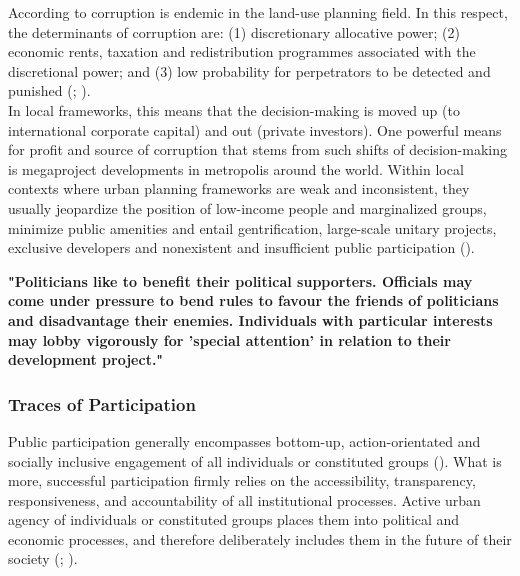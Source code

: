\documentclass[11pt]{report}
\begin{document}
According to
\href{Chiodelli}{\cite{chiodelli_corruption_2015}} corruption is endemic in the land-use planning field.
In this respect, the determinants of corruption are:
(1) discretionary allocative power; (2) economic rents, taxation and redistribution programmes associated with the discretional power; and (3) low probability for perpetrators to be detected and punished
(\href{Healey}{\citealt{healey_collaborative_1997}}; 
\href{Chiodelli}{\citealt{chiodelli_corruption_2015}}).
\\

In local frameworks, this means that the decision-making is moved up (to international corporate capital) and out (private investors).
One powerful means for profit and source of corruption that stems from such shifts of decision-making is megaproject developments in metropolis around the world.
Within local contexts where urban planning frameworks are weak and inconsistent, they usually jeopardize the position of low-income people and marginalized groups, minimize public amenities and entail gentrification, large-scale unitary projects, exclusive developers and nonexistent and insufficient public participation (\href{Farnstein}{\citealt{Farnstein_Just_2010}}). %

\textbf{"Politicians like to benefit their political supporters. Officials may come under pressure to bend rules to favour the friends of politicians and disadvantage their enemies. Individuals with particular interests may lobby vigorously for 'special attention' in relation to their development project." \href{Healey}{\citealt{healey_collaborative_1997}}}

\subsubsection{Traces of Participation}

Public participation generally encompasses bottom-up, action-orientated and socially inclusive engagement of all individuals or constituted groups
(\href{UN}{\citealt{UN_building_2009}}). %
What is more, successful participation firmly relies on the accessibility, transparency, responsiveness, and accountability of all institutional processes. Active urban agency of individuals or constituted groups places them into political and economic processes, and therefore deliberately includes them in the future of their society
(\href{Arnstein}{\citealt{arnstein_ladder_1969}};
\href{Fisher}{\citealt{fisher_building_2001}}).
\\
\end{document}
